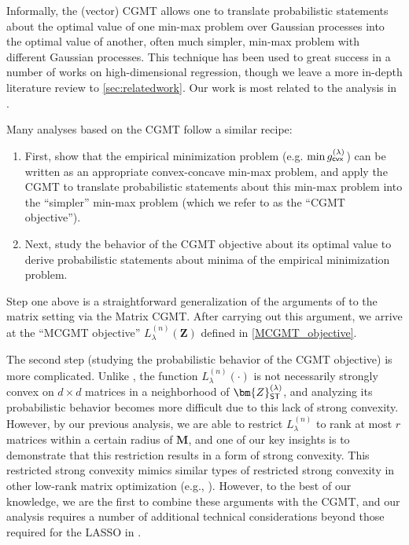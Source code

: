 \documentclass[10pt]{article}
\theoremstyle{definition}
\begin{document}
  
  Informally, the (vector) CGMT allows one to translate probabilistic statements about the optimal value of one min-max problem over Gaussian processes into the optimal value of another, often much simpler, min-max problem with different Gaussian processes.  
 This technique has been used to great success in a number of works on  high-dimensional regression, though we leave a more in-depth literature review to \cref{sec:relatedwork}.  Our work is most related to the analysis in \citet{celentano_lasso_2023}. 
  
  Many analyses based on the CGMT follow a similar recipe:
  \begin{enumerate}
      \item First, show that the empirical minimization  problem (e.g. $\min g^{(\lambda)}_{{\sf cvx}}$) can be written as an appropriate convex-concave min-max problem, and  apply the CGMT to translate probabilistic statements about this min-max problem into the ``simpler'' min-max problem (which we refer to as the ``CGMT objective'').
      \item Next, study the behavior of the CGMT objective about its optimal value to derive probabilistic statements about minima of the empirical minimization problem.
  \end{enumerate}    
  Step one above is a straightforward generalization of the arguments of \citet{celentano_lasso_2023} to the matrix setting via the Matrix CGMT.  After carrying out this argument, we arrive at the ``MCGMT objective'' $L_{\lambda}^{(n)}(\bm{Z})$ defined in \eqref{MCGMT_objective}.  




The second step (studying the probabilistic behavior of the CGMT objective) is more complicated.    Unlike \citet{celentano_lasso_2023}, the function $L_{\lambda}^{(n)}(\cdot)$ is not  necessarily strongly convex on $d \times d$ matrices in a neighborhood of $\bm{Z}_{{\sf ST}}^{(\lambda)}$, and analyzing its probabilistic behavior becomes more difficult due to this lack of strong convexity.  However, by our previous analysis, we are able to restrict $L_{\lambda}^{(n)}$ to rank at most $r$ matrices within a certain radius of $\bm{M}$, and one of our key insights is to demonstrate that this restriction results in a form of strong convexity.  This restricted strong convexity mimics similar types of restricted strong convexity in other low-rank matrix optimization (e.g.,  \citet{chi_nonconvex_2019}). However, to the best of our knowledge, we are the first to combine these arguments with the CGMT, and our analysis requires a number of additional technical considerations beyond those required for the LASSO in \citet{celentano_lasso_2023}. 
\end{document}
